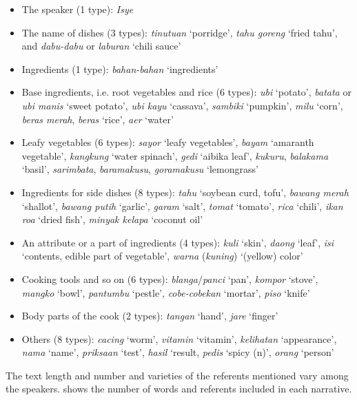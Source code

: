 \documentclass[output=paper
,modfonts
,nonflat]{langsci/langscibook}
\begin{document}
\begin{itemize}
	\item The speaker (1 type): \textit{Isye}
	\item The name of dishes (3 types): \textit{tinutuan} ‘porridge’, \textit{tahu goreng} ‘fried tahu’, and \textit{dabu-dabu} or \textit{laburan} ‘chili sauce’
	\item Ingredients (1 type): \textit{bahan-bahan} ‘ingredients’
	\item Base ingredients, i.e. root vegetables and rice (6 types): \textit{ubi} ‘potato’, \textit{batata} or \textit{ubi manis} ‘sweet potato’, \textit{ubi kayu} ‘cassava’, \textit{sambiki} ‘pumpkin’, \textit{milu} ‘corn’, \textit{beras merah}, \textit{beras} ‘rice’, \textit{aer} ‘water’
	\item Leafy vegetables (6 types): \textit{sayor} ‘leafy vegetables’, \textit{bayam} ‘amaranth vegetable’, \textit{kangkung} ‘water spinach’, \textit{gedi} ‘aibika leaf’, \textit{kukuru}, \textit{balakama} ‘basil’, \textit{sarimbata}, \textit{baramakusu}, \textit{goramakusu} ‘lemongrass’
	\item Ingredients for side dishes (8 types): \textit{tahu} ‘soybean curd, tofu’, \textit{bawang merah} ‘shallot’, \textit{bawang putih} ‘garlic’, \textit{garam} ‘salt’, \textit{tomat} ‘tomato’, \textit{rica} ‘chili’, \textit{ikan roa} ‘dried fish’, \textit{minyak kelapa} ‘coconut oil’
	\item An attribute or a part of ingredients (4 types): \textit{kuli} ‘skin’, \textit{daong} ‘leaf’, \textit{isi} ‘contents, edible part of vegetable’, \textit{warna} (\textit{kuning}) ‘(yellow) color’
	\item Cooking tools and so on (6 types): \textit{blanga}/\textit{panci} ‘pan’, \textit{kompor} ‘stove’, \textit{mangko} ‘bowl’, \textit{pantumbu} ‘pestle’, \textit{cobe-cobekan} ‘mortar’, \textit{piso} ‘knife’
	\item Body parts of the cook (2 types): \textit{tangan} ‘hand’, \textit{jare} ‘finger’
	\item Others (8 types): \textit{cacing} ‘worm’, \textit{vitamin} ‘vitamin’, \textit{kelihatan} ‘appearance’, \textit{nama} ‘name’, \textit{priksaan} ‘test’, \textit{hasil} ‘result, \textit{pedis} ‘spicy (n)’, \textit{orang} ‘person’
\end{itemize}

\noindent
The text length and number and varieties of the referents mentioned vary among the speakers.  shows the number of words and referents included in each narrative.
\end{document}
